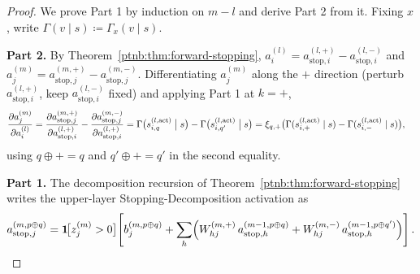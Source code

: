 \begin{proof}
We prove Part 1 by induction on $m-l$ and derive Part 2 from it. Fixing $x$, write
$\Gamma(v\mid s)\coloneqq\Gamma_x(v\mid s)$.

\textbf{Part 2.} By Theorem~\ref{ptnb:thm:forward-stopping}, $a_i^{(l)} = a_{\mathrm{stop},i}^{(l,+)} -
    a_{\mathrm{stop},i}^{(l,-)}$ and $a_j^{(m)} = a_{\mathrm{stop},j}^{(m,+)} -
    a_{\mathrm{stop},j}^{(m,-)}$. Differentiating $a_j^{(m)}$ along the $+$ direction (perturb
$a_{\mathrm{stop},i}^{(l,+)}$, keep $a_{\mathrm{stop},i}^{(l,-)}$ fixed) and applying Part 1 at
$k=+$,
\begin{align}
    \frac{\partial a_j^{(m)}}{\partial a_i^{(l)}}
    &= \frac{\partial a_{\mathrm{stop},j}^{(m,+)}}{\partial a_{\mathrm{stop},i}^{(l,+)}}
    - \frac{\partial a_{\mathrm{stop},j}^{(m,-)}}{\partial a_{\mathrm{stop},i}^{(l,+)}}
    = \Gamma\bigl(s_{i, q}^{(l, \mathrm{act})} \bigm| s\bigr) - \Gamma\bigl(s_{i, q'}^{(l,
    \mathrm{act})} \bigm| s\bigr)
    = \xi_{q,+}\bigl(\Gamma(s_{i,+}^{(l, \mathrm{act})} \mid s) - \Gamma(s_{i,-}^{(l, \mathrm{act})}
    \mid s)\bigr),
\end{align}
using $q \oplus + = q$ and $q' \oplus + = q'$ in the second equality.

\textbf{Part 1.} The decomposition recursion of Theorem~\ref{ptnb:thm:forward-stopping} writes the
upper-layer Stopping-Decomposition activation as
\begin{align}\label{ptnb:eq:adf-astop-recursion}
    a_{\mathrm{stop},j}^{(m, p \oplus q)}
    = \mathbf{1}\!\bigl[z_j^{(m)} > 0\bigr]\!\left[
    b_j^{(m, p \oplus q)}
    + \sum_h \Bigl( W_{hj}^{(m,+)}\, a_{\mathrm{stop},h}^{(m-1, p \oplus q)} + W_{hj}^{(m,-)}\,
    a_{\mathrm{stop},h}^{(m-1, p \oplus q')} \Bigr)
    \right].
\end{align}


\end{proof}
